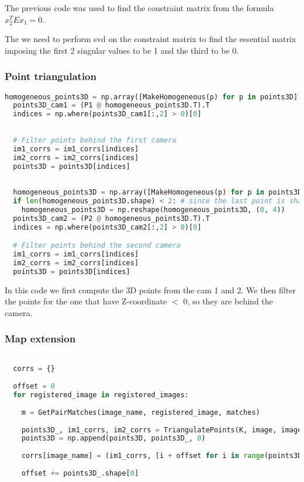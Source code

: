 \documentclass{ETHExercise}
\begin{document}
The previous code was used to find the constraint matrix from 
the formula $x_2^T E x_1 = 0$.

The we need to perform svd on the constraint matrix to find
the essential matrix imposing the first 2 singular values 
to be 1 and the third to be 0.

\subsubsection{Point triangulation}

\begin{lstlisting}[language=Python, caption=point triangulation]
  homogeneous_points3D = np.array([MakeHomogeneous(p) for p in points3D])
  points3D_cam1 = (P1 @ homogeneous_points3D.T).T
  indices = np.where(points3D_cam1[:,2] > 0)[0]
  
  
  # Filter points behind the first camera
  im1_corrs = im1_corrs[indices]
  im2_corrs = im2_corrs[indices]
  points3D = points3D[indices]
  
  
  homogeneous_points3D = np.array([MakeHomogeneous(p) for p in points3D])
  if len(homogeneous_points3D.shape) < 2: # since the last point is shaped as (0, ) instead of (0, 4)
    homogeneous_points3D = np.reshape(homogeneous_points3D, (0, 4))
  points3D_cam2 = (P2 @ homogeneous_points3D.T).T
  indices = np.where(points3D_cam2[:,2] > 0)[0]

  # Filter points behind the second camera
  im1_corrs = im1_corrs[indices]
  im2_corrs = im2_corrs[indices]
  points3D = points3D[indices]

\end{lstlisting}

In this code we first compute the 3D points from the cam 1 and 2. We then filter
the points for the one that have Z-coordinate $<$ 0, so they are behind 
the camera.

\subsubsection{Map extension}

\begin{lstlisting}[language=Python, caption=Trinagulate images]

  corrs = {}
  
  offset = 0
  for registered_image in registered_images:
    
    m = GetPairMatches(image_name, registered_image, matches)
    
    points3D_, im1_corrs, im2_corrs = TriangulatePoints(K, image, images[registered_image], m)
    points3D = np.append(points3D, points3D_, 0)
    
    corrs[image_name] = (im1_corrs, [i + offset for i in range(points3D_.shape[0])])
    
    offset += points3D_.shape[0]
\end{lstlisting}
\end{document}
